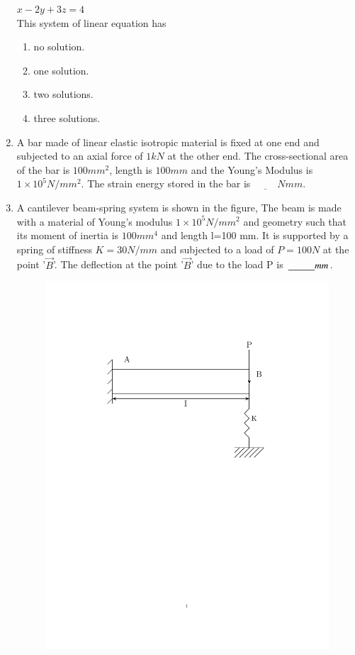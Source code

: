 \documentclass[journal,12pt,onecolumn,article]{IEEEtran}
\theoremstyle{remark}
\begin{document}
\begin{enumerate}
		$x-2y+3z=4$ \\
		This system of linear equation has
		\begin{enumerate}
			\item no solution.
			\item one solution.
			\item two solutions.
			\item three solutions.
		\end{enumerate}
	\item A bar made of linear elastic isotropic material is fixed at one end and subjected to an axial force of $1 kN$ at the other end. The cross-sectional area of the bar is $100 mm^2$, length is $100 mm$ and the Young's Modulus is $1 \times 10^5 N/mm^2$. The strain energy stored in the bar is $\underline{\hspace{1cm}} Nmm$.
	\item A cantilever beam-spring system is shown in the figure, The beam is made with a material of Young's modulus $1 \times 10^5 N/mm^2$ and geometry such that its moment of inertia is $100 mm^4$ and length l=100 mm. It is supported by a spring of stiffness $K=30 N/mm$ and subjected to a load of $P=100N$ at the point '$\vec{B}$'. The deflection at the point '$\vec{B}$' due to the load P is $\underline{\hspace{1 cm}}mm$.
		\vspace{-66pt}	
		\begin{figure}[H]
	\centering
				\begin{minipage}{0.71\textwidth}
	\includegraphics[width=0.7\linewidth]{figs/fig38/fig38.pdf}

\end{minipage}
\end{figure}
\end{enumerate}
\end{document}
